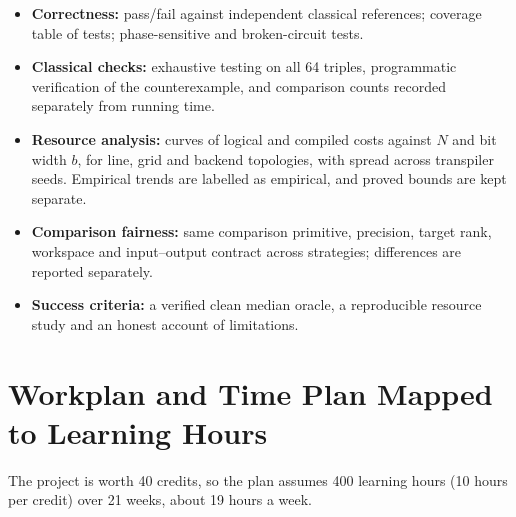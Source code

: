 \documentclass[11pt,a4paper]{article}
\begin{document}
\begin{itemize}
  \item \textbf{Correctness:} pass/fail against independent classical references; coverage table of tests; phase-sensitive and broken-circuit tests.
  \item \textbf{Classical checks:} exhaustive testing on all 64 triples, programmatic verification of the counterexample, and comparison counts recorded separately from running time.
  \item \textbf{Resource analysis:} curves of logical and compiled costs against $N$ and bit width $b$, for line, grid and backend topologies, with spread across transpiler seeds. Empirical trends are labelled as empirical, and proved bounds are kept separate.
  \item \textbf{Comparison fairness:} same comparison primitive, precision, target rank, workspace and input--output contract across strategies; differences are reported separately.
  \item \textbf{Success criteria:} a verified clean median oracle, a reproducible resource study and an honest account of limitations.
\end{itemize}

\section{Workplan and Time Plan Mapped to Learning Hours}

The project is worth 40 credits, so the plan assumes 400 learning hours (10 hours per credit) over 21 weeks, about 19 hours a week.
\end{document}
